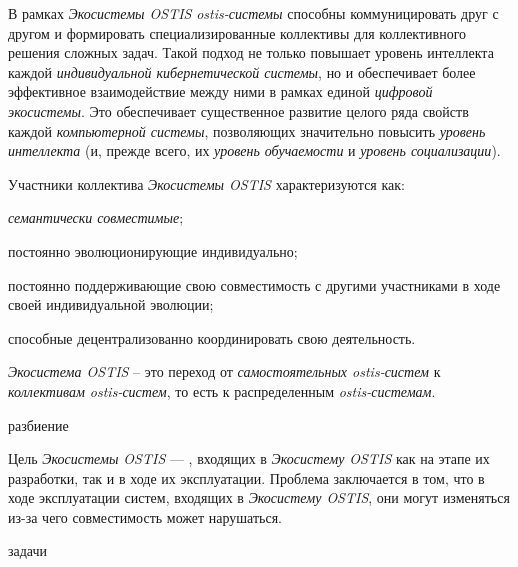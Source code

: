 В рамках \textit{Экосистемы OSTIS} \textit{ostis-системы} способны коммуницировать друг с другом и формировать специализированные коллективы для коллективного решения сложных задач. Такой подход не только повышает уровень интеллекта каждой \textit{индивидуальной кибернетической системы}, но и обеспечивает более эффективное взаимодействие между ними в рамках единой \textit{цифровой экосистемы}. Это обеспечивает существенное развитие целого ряда свойств каждой \textit{компьютерной системы}, позволяющих значительно повысить \textit{уровень интеллекта} (и, прежде всего, их \textit{уровень обучаемости} и \textit{уровень социализации}). 

Участники коллектива \textit{Экосистемы OSTIS} характеризуются как:
\begin{textitemize}
    \item \textit{семантически совместимые};
    \item постоянно эволюционирующие индивидуально;
    \item постоянно поддерживающие свою совместимость с другими участниками в ходе своей индивидуальной эволюции;
    \item способные децентрализованно координировать свою деятельность.
\end{textitemize}

\textit{Экосистема OSTIS} – это переход от \textit{самостоятельных ostis-систем} к \textit{коллективам ostis-систем}, то есть к распределенным \textit{ostis-системам}.

\begin{SCn}
\begin{scnrelfromset}{разбиение}
\end{scnrelfromset}
\end{SCn}

Цель \textit{Экосистемы OSTIS} --- , входящих в \textit{Экосистему OSTIS} как на этапе их разработки, так и в ходе их эксплуатации. 
Проблема заключается в том, что в ходе эксплуатации систем, входящих в \textit{Экосистему OSTIS}, они могут изменяться из-за чего совместимость может нарушаться. 
\begin{SCn}
    \begin{scnrelfromlistcustom}{задачи}
    \end{scnrelfromlistcustom}
\end{SCn}


